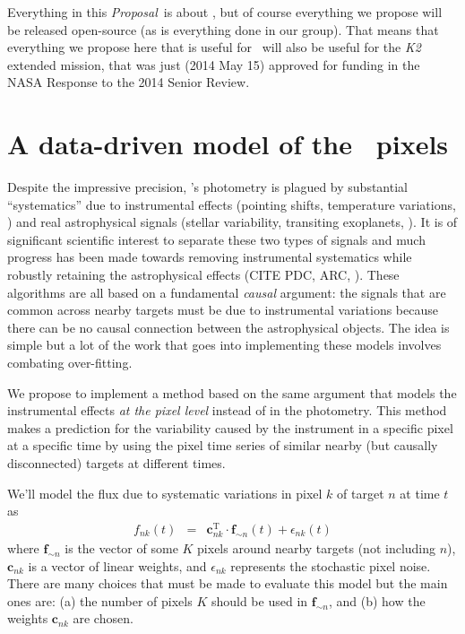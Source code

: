 \documentclass[letterpaper,12pt,preprint]{hack_aastex}
\newcommand{\bvec}[1]{{\ensuremath{{\boldsymbol{#1}}}}}
\newcommand{\documentname}{\textsl{Proposal}}
\begin{document}
Everything in this \documentname\ is about \Kepler, but of course everything we
propose will be released open-source (as is everything done in our group).
That means that everything we propose here that is useful for \Kepler\ will
also be useful for the \textsl{K2} extended mission, that was just (2014 May 15)
approved for funding in the NASA Response to the 2014 Senior Review.

\section{A data-driven model of the \Kepler\ pixels}

Despite the impressive precision, \Kepler's photometry is plagued by
substantial ``systematics'' due to instrumental effects (pointing shifts,
temperature variations, \etc) and real astrophysical signals (stellar
variability, transiting exoplanets, \etc).
It is of significant scientific interest to separate these two types of
signals and much progress has been made towards removing instrumental
systematics while robustly retaining the astrophysical effects (CITE PDC, ARC,
\etc).
These algorithms are all based on a fundamental \emph{causal} argument: the
signals that are common across nearby targets must be due to instrumental
variations because there can be no causal connection between the astrophysical
objects.
The idea is simple but a lot of the work that goes into implementing these
models involves combating over-fitting.

We propose to implement a method based on the same argument that models the
instrumental effects \emph{at the pixel level} instead of in the photometry.
This method makes a prediction for the variability caused by the instrument in
a specific pixel at a specific time by using the pixel time series of similar
nearby (but causally disconnected) targets at different times.

We'll model the flux due to systematic variations in pixel $k$ of target
$n$ at time $t$ as
\begin{eqnarray}
f_{nk}(t) &=& \bvec{c}_{nk}^\mathrm{T}\cdot\bvec{f}_{\sim n}(t)
              + \epsilon_{nk}(t)
\end{eqnarray}
where $\bvec{f}_{\sim n}$ is the vector of some $K$ pixels around nearby
targets (not including $n$), $\bvec{c}_{nk}$ is a vector of linear weights,
and $\epsilon_{nk}$ represents the stochastic pixel noise.
There are many choices that must be made to evaluate this model but the main
ones are: (a) the number of pixels $K$ should be used in $\bvec{f}_{\sim n}$,
and (b) how the weights $\bvec{c}_{nk}$ are chosen.
\end{document}
